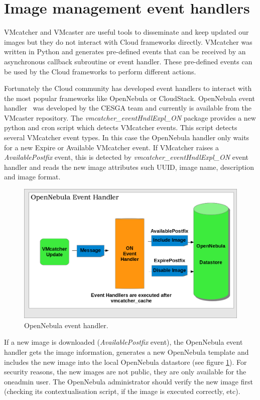\documentclass{cai}
\begin{document}
\section{Image management event handlers}
\label{sect-handlers}
VMcatcher and VMcaster are useful tools to disseminate and keep updated our images but they do not interact with Cloud frameworks directly.
VMcatcher was written in Python and generates pre-defined events that can be received by an asynchronous callback subroutine or event handler.
These pre-defined events can be used by the Cloud frameworks to perform different actions.

Fortunately the Cloud community has developed event handlers to interact with the most popular frameworks like OpenNebula or CloudStack.
OpenNebula event handler~\cite{onevent} was developed by the CESGA team and currently is available from the VMcaster repository. 
The \textit{vmcatcher\_eventHndlExpl\_ON} package provides a new python and cron script which detects VMcatcher events. 
This script detects several VMcatcher event types. In this case the OpenNebula handler only waits for a new Expire or Available VMcatcher event.
If VMcatcher raises a \textit{AvailablePostfix} event, this is detected by \textit{vmcatcher\_eventHndlExpl\_ON} event handler and reads the new image attributes such UUID, image name, description and image format.

\begin{figure}
\centering
\includegraphics[width=1\textwidth]{ONeventhandler.png}
\caption{OpenNebula event handler.}
\label{fig:onevent}
\end{figure}

If a new image is downloaded (\textit{AvailablePostfix} event), the OpenNebula event handler gets the image information, generates a new OpenNebula template and includes the new image into the local OpenNebula datastore (see figure \ref{fig:onevent}). 
For security reasons, the new images are not public, they are only available for the oneadmin user. The OpenNebula administrator should verify the new image first (checking its contextualisation script, if the image is executed correctly, etc).
\end{document}
